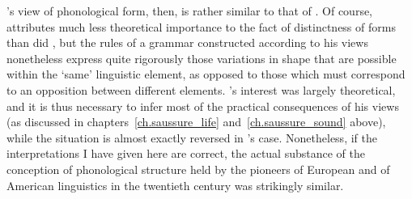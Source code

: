 {\Boas}'s view of phonological form, then, is rather similar to that of
{\Saussure}. Of course, {\Boas} attributes much less theoretical importance
to the fact of distinctness of forms than did {\Saussure}, but the rules
of a grammar constructed according to his views nonetheless express
quite rigorously those variations in shape that are possible within
the `same' linguistic element, as opposed to those which must
correspond to an opposition between different elements. {\Saussure}'s
interest was largely theoretical, and it is thus necessary to infer
most of the practical consequences of his views (as discussed in
chapters~\ref{ch.saussure_life} and~\ref{ch.saussure_sound} above),
while the situation is almost exactly reversed in {\Boas}'s
case. Nonetheless, if the interpretations I have given here are
correct, the actual substance of the conception of phonological
structure held by the pioneers of European and of American linguistics
in the twentieth century was strikingly similar.


